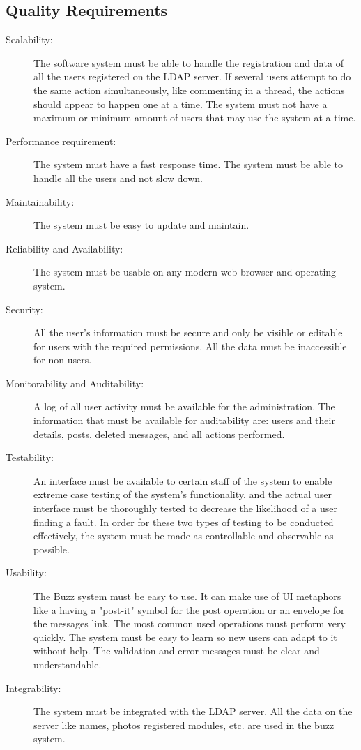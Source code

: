 \documentclass[12pt]{article}
\begin{document}
\subsection{Quality Requirements}
\begin{description}
  \item[Scalability:] 
        The software system must be able to handle the registration and data of all the users registered on the LDAP server. 
       If several users attempt to do the same action simultaneously, like commenting in a thread, the actions should appear to happen one at a time. 
      The system must not have a maximum or minimum amount of users that may use the system at a time.
  \item[Performance requirement:]
      The system must have a fast response time. The system must be able to handle all the users and not slow down.
  \item[Maintainability:] 
      The system must be easy to update and maintain.
  \item[Reliability and Availability:]
      The system must be usable on any modern web browser and operating system.
  \item[Security:]
      All the user's information must be secure and only be visible or editable for users with the required permissions. All the data must be inaccessible for non-users.
  \item[Monitorability and Auditability:]
      A log of all user activity must be available for the administration. The information that must be available for auditability are: users and their details, posts, deleted messages, and all actions performed.
  \item[Testability:]
      An interface must be available to certain staff of the system to enable extreme case testing of the system's functionality, and the actual user interface must be thoroughly tested to decrease the likelihood of a user finding a fault. In order for these two types of testing to be conducted effectively, the system must be made as controllable and observable as possible.
  \item[Usability:]
      The Buzz system must be easy to use. It can make use of UI metaphors like a having a "post-it" symbol for the post operation or an envelope for the messages link.
      The most common used operations must perform very quickly. The system must be easy to learn so new users can adapt to it without help. 
      The validation and error messages must be clear and understandable.
  \item[Integrability:]
      The system must be integrated with the LDAP server. 
      All the data on the server like names, photos registered modules, etc. are used in the buzz system. 
\end{description}
\end{document}
